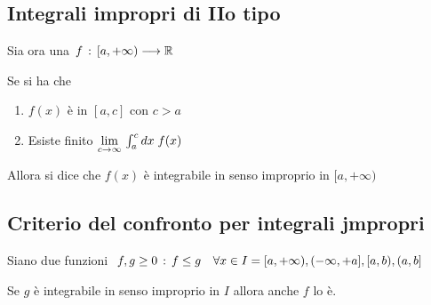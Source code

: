 \newpage

\subsection{Integrali impropri di IIo tipo}

Sia ora una $f \, : \, [a,+\infty) \longrightarrow \mathbb{R}$

Se si ha che
\begin{enumerate}
	\item $f(x)$ è \Rint in $[a,c]$ con $c>a$
	\item Esiste finito $\underset{c \rightarrow \infty}{\lim} \, \int_{a}^{c} dx \; f(x)$ 
\end{enumerate}

Allora si dice che $f(x)$ è integrabile in senso improprio in $[a,+\infty)$ 

\begin{figure}[!htb]
\end{figure}
\begin{figure}[!htb]
\end{figure}

\subsection{Criterio del confronto per integrali jmpropri}

Siano due funzioni $f,g\geq 0 \, : \, f \leq g \quad \forall x \in I=[a, + \infty), (-\infty, +a],[a,b) , (a,b]$  

Se $g$ è integrabile in senso improprio in $I$ allora anche $f$ lo è.

\begin{figure}[!htb]
\end{figure}

